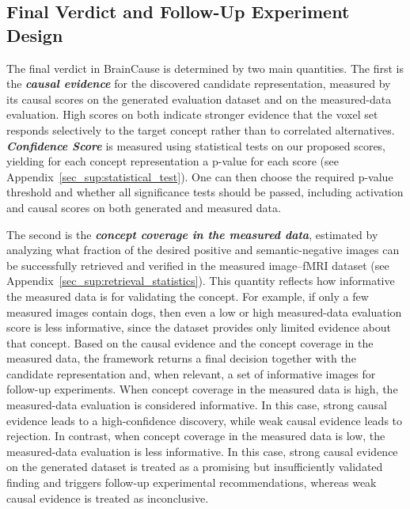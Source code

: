 \documentclass{llmxive}
\begin{document}
\subsection{Final Verdict and Follow-Up Experiment Design}
\label{sec:method:Steps:Final}

The final verdict in BrainCause is determined by two main quantities. The first is the \emph{\textbf{causal evidence}} for the discovered candidate representation, measured by its causal scores on the generated evaluation dataset and on the measured-data evaluation. High scores on both indicate stronger evidence that the voxel set responds selectively to the target concept rather than to correlated alternatives.
\emph{\textbf{Confidence Score}} is measured using statistical tests on our proposed scores, yielding for each concept representation a p-value for each score (see Appendix~\ref{sec_sup:statistical_test}). One can then choose the required p-value threshold and whether all significance tests should be passed, including activation and causal scores on both generated and measured data.

The second is the \emph{\textbf{concept coverage in the measured data}}, estimated by analyzing what fraction of the desired positive and semantic-negative images can be successfully retrieved and verified in the measured image--fMRI dataset (see Appendix~\ref{sec_sup:retrieval_statistics}). This quantity reflects how informative the measured data is for validating the concept. For example, if only a few measured images contain dogs, then even a low or high measured-data evaluation score is less informative, since the dataset provides only limited evidence about that concept.
Based on the causal evidence and the concept coverage in the measured data, the framework returns a final decision together with the candidate representation and, when relevant, a set of informative images for follow-up experiments. 
When concept coverage in the measured data is high, the measured-data evaluation is considered informative. In this case, strong causal evidence leads to a high-confidence discovery, while weak causal evidence leads to rejection. In contrast, when concept coverage in the measured data is low, the measured-data evaluation is less informative. In this case, strong causal evidence on the generated dataset is treated as a promising but insufficiently validated finding and triggers follow-up experimental recommendations, whereas weak causal evidence is treated as inconclusive.
\end{document}
